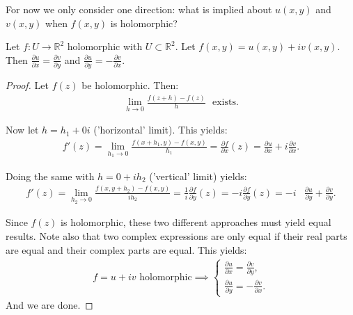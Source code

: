For now we only consider one direction: what is implied about $u(x,y)$ and $v(x,y)$ when $f(x,y)$ is holomorphic?\\


\begin{theorem}\label{thm:holc-implies-CR}
Let $f:U \xrightarrow{} \mathbb{R}^2$ holomorphic with $U \subset \mathbb{R}^2$. Let $f(x,y) = u(x,y)+iv(x,y)$. Then $\frac{\partial u}{\partial x} = \frac{\partial v}{\partial y}$ and $\frac{\partial u}{\partial y} = -\frac{\partial v}{\partial x}$.
\end{theorem}

\begin{proof}
Let $f(z)$ be holomorphic. Then:
\begin{align*}
    \lim_{h\xrightarrow{} 0} \frac{f(z+h)-f(z)}{h} \,\, \text{   exists.}
\end{align*}

Now let $h=h_1+0i$ ('horizontal' limit). This yields:
\begin{align*}
     f'(z) = \lim_{h_1\xrightarrow{} 0} \frac{f(x+h_1,y)-f(x,y)}{h_1} = \frac{\partial f}{\partial x}(z) = \frac{\partial u}{\partial x} + i \frac{\partial v}{\partial x}.
\end{align*}


Doing the same with $h=0+ih_2$ ('vertical' limit) yields:
\begin{align*}
    f'(z) = \lim_{h_2\xrightarrow{} 0} \frac{f(x,y+h_2)-f(x,y)}{ih_2} = \frac{1}{i}\frac{\partial f}{\partial y}(z) = -i\frac{\partial f}{\partial y}(z) =-i&\frac{\partial u}{\partial y} +  \frac{\partial v}{\partial y}.
\end{align*}

Since $f(z)$ is holomorphic, these two different approaches must yield equal results. Note also that two complex expressions are only equal if their real parts are equal and their complex parts are equal. This yields:
\begin{align*}
    f = u + i v \text{ holomorphic} \implies
    \begin{cases}
        \frac{\partial u}{\partial x} = \frac{\partial v}{\partial y},\\
        \frac{\partial u}{\partial y} = -\frac{\partial v}{\partial x}.
    \end{cases}
\end{align*}
And we are done.
\end{proof}\\

